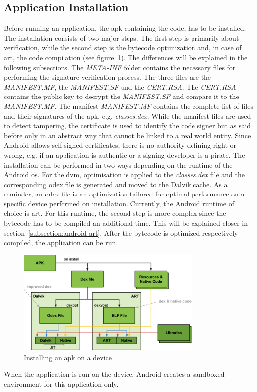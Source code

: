 \subsection{Application Installation} \label{subsection:android-install}
Before running an application, the \gls{apk} containing the code, has to be installed.
The installation consists of two major steps.
The first step is primarily about verification, while the second step is the bytecode optimization and, in case of \gls{art}, the code compilation (see figure~\ref{fig:install}).
The differences will be explained in the following subsections.
\newline
The \textit{META-INF} folder contains the necessary files for performing the signature verification process.
The three files are the \textit{MANIFEST.MF}, the \textit{MANIFEST.SF} und the \textit{CERT.RSA}.
The \textit{CERT.RSA} contains the public key to decrypt the \textit{MANIFEST.SF} and compare it to the \textit{MANIFEST.MF}.
The manifest \textit{MANIFEST.MF} contains the complete list of files and their signatures of the \gls{apk}, e.g. \textit{classes.dex}.
While the manifest files are used to detect tampering, the certificate is used to identify the code signer but as said before only in an abstract way that cannot be linked to a real world entity.
Since Android allows self-signed certificates, there is no authority defining right or wrong, e.g. if an application is authentic or a signing developer is a pirate. \cite{codeSigning} \cite{androidSigning} \cite{nelenkovSelf}
\newline
The installation can be performed in two ways depending on the runtime of the Android \gls{os}.
For the \gls{dvm}, optimisation is applied to the \textit{classes.dex} file and the corresponding \gls{odex} file is generated and moved to the Dalvik cache.
As a reminder, an \gls{odex} file is an optimization tailored for optimal performance on a specific device performed on installation.
\newline
Currently, the Android runtime of choice is \gls{art}.
For this runtime, the second step is more complex since the bytecode has to be compiled an additional time.
This will be explained closer in section~\ref{subsection:android-art}.
\newline
After the bytecode is optimized respectively compiled, the application can be run.
\newline
\begin{figure}[h]
    \centering
    \includegraphics[width=0.8\textwidth]{data/install.png}
    \caption{Installing an \gls{apk} on a device \cite{googleIOArt}}
    \label{fig:install}
\end{figure}
When the application is run on the device, Android creates a sandboxed environment for this application only.
